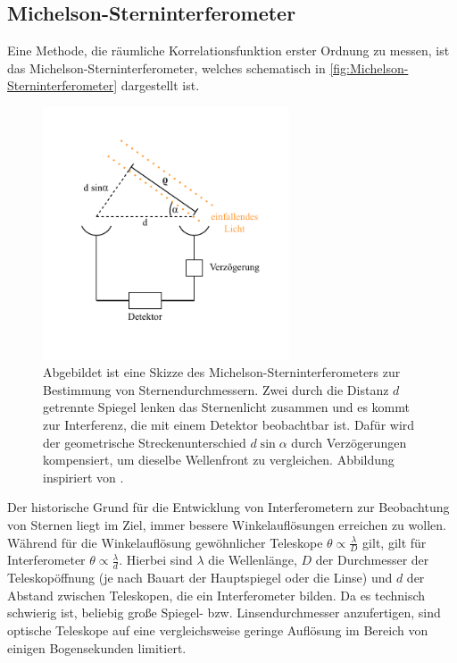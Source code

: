 \subsection{Michelson-Sterninterferometer}
\label{ssec:Michelson-Sterninterferometer}
Eine Methode, die räumliche Korrelationsfunktion erster Ordnung zu messen, ist das Michelson-Sterninterferometer, welches schematisch in \autoref{fig:Michelson-Sterninterferometer} dargestellt ist. 
\begin{figure}[h]
    \centering
    \includegraphics[width=0.65\textwidth]{images/Theorie/Michelson_Interferometer.pdf}
    \caption{Abgebildet ist eine Skizze des Michelson-Sterninterferometers zur Bestimmung von Sternendurchmessern. Zwei durch die Distanz $d$ getrennte Spiegel lenken das Sternenlicht zusammen und es kommt zur Interferenz, die mit einem Detektor beobachtbar ist. Dafür wird der geometrische Streckenunterschied $d\sin\alpha$ durch Verzögerungen kompensiert, um dieselbe Wellenfront zu vergleichen. Abbildung inspiriert von \cite[Fig. 1]{foellmiIntensityInterferometrySecondorder2009}.}
    \label{fig:Michelson-Sterninterferometer}
\end{figure}
Der historische Grund für die Entwicklung von Interferometern zur Beobachtung von Sternen liegt im Ziel, immer bessere Winkelauflösungen erreichen zu wollen. 
Während für die Winkelauflösung gewöhnlicher Teleskope $\theta \propto \frac{\lambda}{D}$ gilt, gilt für Interferometer $\theta \propto \frac{\lambda}{d}$. 
Hierbei sind $\lambda$ die Wellenlänge, $D$ der Durchmesser der Teleskopöffnung (je nach Bauart der Hauptspiegel oder die Linse) und $d$ der Abstand zwischen Teleskopen, die ein Interferometer bilden. 
Da es technisch schwierig ist, beliebig große Spiegel- bzw. Linsendurchmesser anzufertigen, sind optische Teleskope auf eine vergleichsweise geringe Auflösung im Bereich von einigen Bogensekunden limitiert. 
